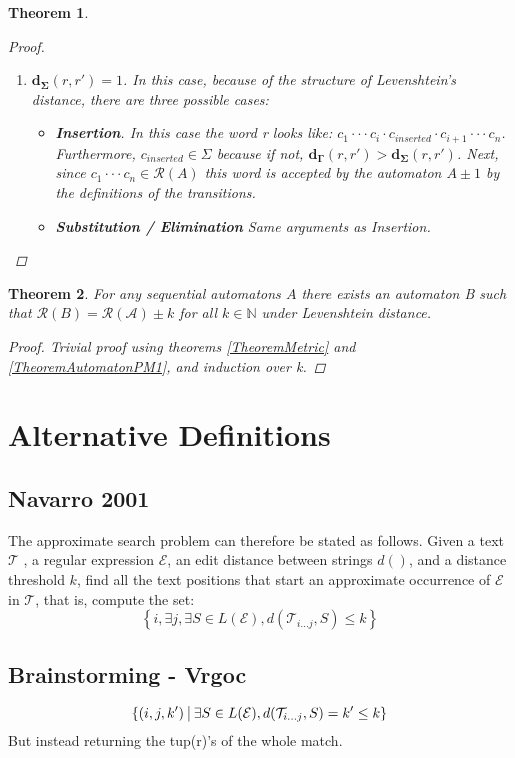 \documentclass{article}
\newcommand{\set}[1]{\left\{#1\right\}}
\newcommand{\st}{\ \vline \ }
\newtheorem{theorem}{Theorem}
\begin{document}
\begin{theorem}
\begin{proof}
\begin{enumerate}
            \item $\mathbf{d_\Sigma}(r, r') = 1$. In this case,
            because of the structure of Levenshtein's distance,
            there are three possible cases:

            \begin{itemize}
                \item \textbf{Insertion}. In this case the word r looks like:
                    $c_1 \cdot\cdot\cdot c_i \cdot c_{inserted} \cdot c_{i + 1} \cdot\cdot\cdot c_n$. Furthermore, $c_{inserted} \in \Sigma$ because if not, $\mathbf{d_\Gamma}(r,r') > \mathbf{d_\Sigma}(r,r')$. Next, since $c_1\cdot\cdot\cdot c_n \in \mathcal{R}(A)$ this word is accepted by the automaton $A\pm1$ by the definitions of the transitions.
                \item \textbf{Substitution / Elimination} Same arguments as Insertion.
            \end{itemize}
        \end{enumerate}
    \end{proof}
\end{theorem}

\begin{theorem}
    For any sequential automatons $A$ there exists an automaton B such that $\mathcal{R}(B) = \mathcal{R(A)} \pm k$ for all $k\in \mathbb{N}$ under Levenshtein distance.
    \begin{proof}
        Trivial proof using theorems \ref{TheoremMetric} and \ref{TheoremAutomatonPM1}, and induction over k.
    \end{proof}
\end{theorem}


\section{Alternative Definitions}

\subsection{Navarro 2001}
The approximate search problem can therefore be stated as follows.
Given a text $\mathcal{T}$ , a regular expression $\mathcal{E}$,
an edit distance between strings $d()$, and a distance threshold
$k$, find all the text positions that start an approximate occurrence
of $\mathcal{E}$ in $\mathcal{T}$, that is, compute the set:
\begin{equation*}
    \set{i, \exists j, \exists S \in L(\mathcal{E}), d(\mathcal{T}_{i...j} , S) \leq k}
\end{equation*}

\subsection{Brainstorming - Vrgoc}
\begin{equation*}
    \set{(i, j, k') \st \exists S \in L(\mathcal{E}), d(\mathcal{T}_{i...j},S) = k' \leq k}
\end{equation*}
But instead returning the tup(r)'s of the whole match.
\end{document}
